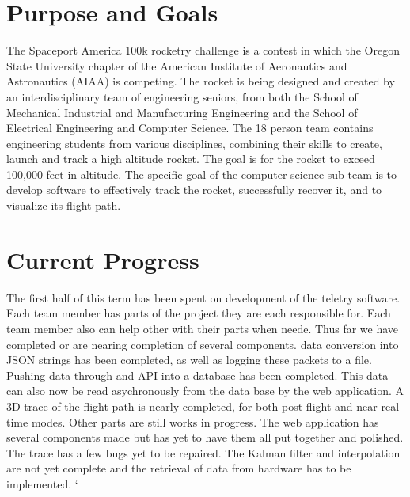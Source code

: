 \documentclass[onecolumn, draftclsnofoot,10pt, compsoc]{IEEEtran}
\begin{document}
\section {Purpose and Goals}
The Spaceport America 100k rocketry challenge is a contest in which the Oregon State University chapter of the American Institute of Aeronautics and Astronautics (AIAA) is competing. The rocket is being designed and created by an interdisciplinary team of engineering seniors, from both the School of Mechanical Industrial and Manufacturing Engineering and the School of Electrical Engineering and Computer Science. The 18 person team contains engineering students from various disciplines, combining their skills to create, launch and track a high altitude rocket. The goal is for the rocket to exceed 100,000 feet in altitude. The specific goal of the computer science sub-team is to develop software to effectively track the rocket, successfully recover it, and to visualize its flight path. \par
\section {Current Progress} 
The first half of this term has been spent on development of the teletry software. Each team member has parts of the project they are each responsible for. Each team member also can help other with their parts when neede. Thus far we have completed or are nearing completion of several components. data conversion into JSON strings has been completed, as well as logging these packets to a file. Pushing data through and API into a database has been completed. This data can also now be read asychronously from the data base by the web application. A 3D trace of the flight path is nearly completed, for both post flight and near real time modes. Other parts are still works in progress. The web application has several components made but has yet to have them all put together and polished. The trace has a few bugs yet to be repaired. The Kalman filter and interpolation are not yet complete and the retrieval of data from hardware has to be implemented. `\par
\end{document}
